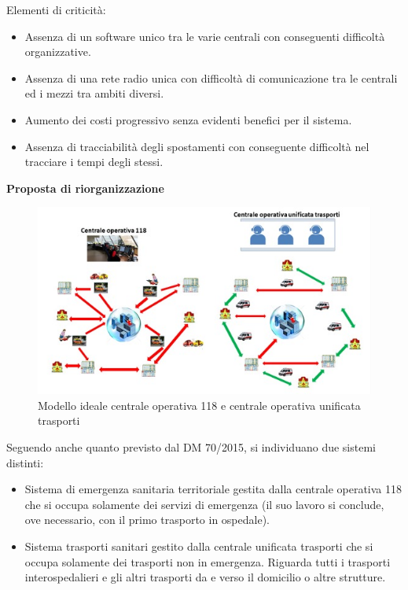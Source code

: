 \documentclass[12pt]{article}
\begin{document}
Elementi di criticità:
\begin{itemize}
    \item Assenza di un software unico tra le varie centrali con conseguenti difficoltà organizzative.
    \item Assenza di una rete radio unica con difficoltà di comunicazione tra le centrali ed i mezzi tra ambiti diversi.
    \item Aumento dei costi progressivo senza evidenti benefici per il sistema.
    \item Assenza di tracciabilità degli spostamenti con conseguente difficoltà nel tracciare i tempi degli stessi.
\end{itemize}

\textbf{Proposta di riorganizzazione}

 \begin{figure}[!ht]
    \centering
      \includegraphics[width=13cm]{fig/modelloIdeale.jpeg}
      \caption{Modello ideale centrale operativa 118 e centrale operativa unificata trasporti}
      \label{modello_ideale}
    \end{figure}
    
Seguendo anche quanto previsto dal DM 70/2015, si individuano due sistemi distinti:
\begin{itemize}
    \item Sistema di emergenza sanitaria territoriale gestita dalla centrale operativa 118 che si occupa solamente dei servizi di emergenza (il suo lavoro si conclude, ove necessario, con il primo trasporto in ospedale).
    \item Sistema trasporti sanitari gestito dalla centrale unificata trasporti che si occupa solamente dei trasporti non in emergenza. Riguarda tutti i trasporti interospedalieri e gli altri trasporti da e verso il domicilio o altre strutture.
\end{itemize}
    
\end{document}
